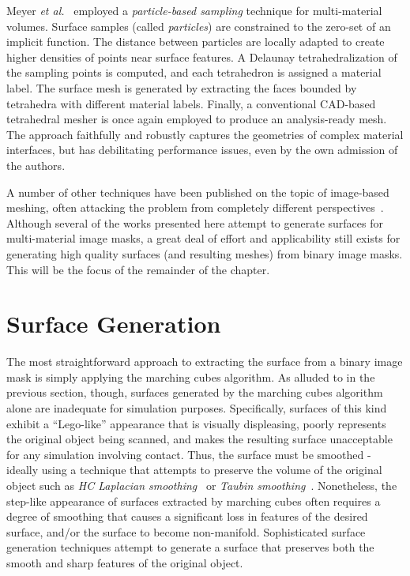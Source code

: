 Meyer \textit{et al.}~\cite{meyer_2008} employed a \textit{particle-based sampling} technique for multi-material volumes. Surface samples (called \textit{particles}) are constrained to the zero-set of an implicit function. The distance between particles are locally adapted to create higher densities of points near surface features. A Delaunay tetrahedralization of the sampling points is computed, and each tetrahedron is assigned a material label. The surface mesh is generated by extracting the faces bounded by tetrahedra with different material labels. Finally, a conventional CAD-based tetrahedral mesher is once again employed to produce an analysis-ready mesh. The approach faithfully and robustly captures the geometries of complex material interfaces, but has debilitating performance issues, even by the own admission of the authors.

A number of other techniques have been published on the topic of image-based meshing, often attacking the problem from completely different perspectives~\cite{bronson_2014,fang_2009,boissonnat_2009,zhao_2016}. Although several of the works presented here attempt to generate surfaces for multi-material image masks, a great deal of effort and applicability still exists for generating high quality surfaces (and resulting meshes) from binary image masks. This will be the focus of the remainder of the chapter.

\section{Surface Generation}
\label{Surface Generation}

The most straightforward approach to extracting the surface from a binary image mask is simply applying the marching cubes algorithm. As alluded to in the previous section, though, surfaces generated by the marching cubes algorithm alone are inadequate for simulation purposes. Specifically, surfaces of this kind exhibit a ``Lego-like'' appearance that is visually displeasing, poorly represents the original object being scanned, and makes the resulting surface unacceptable for any simulation involving contact. Thus, the surface must be smoothed - ideally using a technique that attempts to preserve the volume of the original object such as \textit{HC Laplacian smoothing}~\cite{vollmer_1999} or \textit{Taubin smoothing}~\cite{taubin_1995}. Nonetheless, the step-like appearance of surfaces extracted by marching cubes often requires a degree of smoothing that causes a significant loss in features of the desired surface, and/or the surface to become non-manifold. Sophisticated surface generation techniques attempt to generate a surface that preserves both the smooth and sharp features of the original object.

